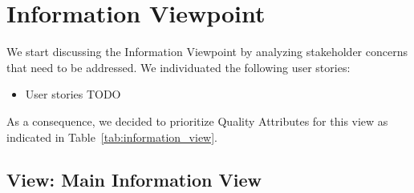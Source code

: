 

\section{Information Viewpoint}
We start discussing the Information Viewpoint by analyzing stakeholder concerns that need to be addressed.
We individuated the following user stories:
\begin{itemize}
    \item User stories TODO
\end{itemize}

As a consequence, we decided to prioritize Quality Attributes for this view as indicated in Table~\ref{tab:information_view}.

\begin{table}[h!]
    \centering
    \caption{Information View Prioritized Quality Attributes}
    \label{tab:information_view}
\end{table}

\subsection{View: Main Information View}
